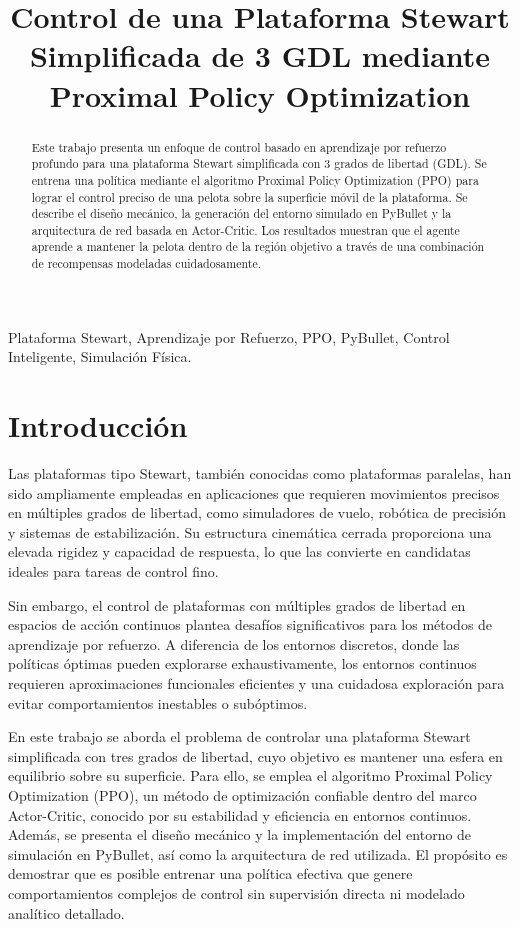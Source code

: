 \documentclass[conference]{IEEEtran}
\title{Control de una Plataforma Stewart Simplificada de 3 GDL mediante Proximal Policy Optimization}
\author{
    \IEEEauthorblockN{Joel Ibaceta}
    \IEEEauthorblockA{
        \textit{Universidad Nacional de Ingeniería} \\
        joel.ibaceta.c@uni.pe
    }
}
\begin{document}
\maketitle

\begin{abstract}
Este trabajo presenta un enfoque de control basado en aprendizaje por refuerzo profundo para una plataforma Stewart simplificada con 3 grados de libertad (GDL). Se entrena una política mediante el algoritmo Proximal Policy Optimization (PPO) para lograr el control preciso de una pelota sobre la superficie móvil de la plataforma. Se describe el diseño mecánico, la generación del entorno simulado en PyBullet y la arquitectura de red basada en Actor-Critic. Los resultados muestran que el agente aprende a mantener la pelota dentro de la región objetivo a través de una combinación de recompensas modeladas cuidadosamente.
\end{abstract}

\begin{IEEEkeywords}
Plataforma Stewart, Aprendizaje por Refuerzo, PPO, PyBullet, Control Inteligente, Simulación Física.
\end{IEEEkeywords}

\section{Introducción}
Las plataformas tipo Stewart, también conocidas como plataformas paralelas, han sido ampliamente empleadas en aplicaciones que requieren movimientos precisos en múltiples grados de libertad, como simuladores de vuelo, robótica de precisión y sistemas de estabilización. Su estructura cinemática cerrada proporciona una elevada rigidez y capacidad de respuesta, lo que las convierte en candidatas ideales para tareas de control fino.

Sin embargo, el control de plataformas con múltiples grados de libertad en espacios de acción continuos plantea desafíos significativos para los métodos de aprendizaje por refuerzo. A diferencia de los entornos discretos, donde las políticas óptimas pueden explorarse exhaustivamente, los entornos continuos requieren aproximaciones funcionales eficientes y una cuidadosa exploración para evitar comportamientos inestables o subóptimos.

En este trabajo se aborda el problema de controlar una plataforma Stewart simplificada con tres grados de libertad, cuyo objetivo es mantener una esfera en equilibrio sobre su superficie. Para ello, se emplea el algoritmo Proximal Policy Optimization (PPO), un método de optimización confiable dentro del marco Actor-Critic, conocido por su estabilidad y eficiencia en entornos continuos. Además, se presenta el diseño mecánico y la implementación del entorno de simulación en PyBullet, así como la arquitectura de red utilizada. El propósito es demostrar que es posible entrenar una política efectiva que genere comportamientos complejos de control sin supervisión directa ni modelado analítico detallado.
\end{document}
